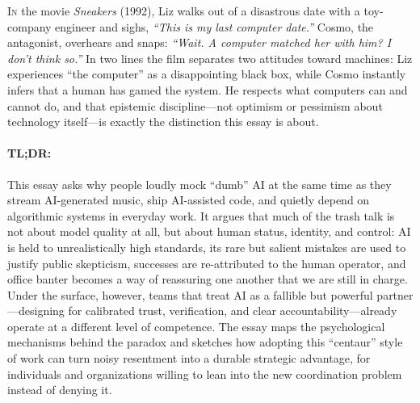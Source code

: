 \documentclass[11pt, a4paper, twocolumn]{article} %
\begin{document}
\color{white}


\vspace*{\fill}

\noindent
\makeatletter
\@date\par
\makeatother

\vspace*{0.2cm}

\lettrine[lines=3,lhang=0.1,findent=1pt]{I}n the movie \emph{Sneakers} (1992), Liz walks out of a disastrous date with a toy-company engineer and sighs, \textit{``This is my last computer date.''} Cosmo, the antagonist, overhears and snaps: \textit{``Wait. A computer matched her with him? I don't think so.''} In two lines the film separates two attitudes toward machines: Liz experiences ``the computer'' as a disappointing black box, while Cosmo instantly infers that a human has gamed the system. He respects what computers can and cannot do, and that epistemic discipline---not optimism or pessimism about technology itself---is exactly the distinction this essay is about.

\newpage
\vspace*{\fill}

\paragraph{TL;DR:} This essay asks why people loudly mock ``dumb'' AI at the same time as they stream AI-generated music, ship AI-assisted code, and quietly depend on algorithmic systems in everyday work. It argues that much of the trash talk is not about model quality at all, but about human status, identity, and control: AI is held to unrealistically high standards, its rare but salient mistakes are used to justify public skepticism, successes are re-attributed to the human operator, and office banter becomes a way of reassuring one another that we are still in charge. Under the surface, however, teams that treat AI as a fallible but powerful partner---designing for calibrated trust, verification, and clear accountability---already operate at a different level of competence. The essay maps the psychological mechanisms behind the paradox and sketches how adopting this ``centaur'' style of work can turn noisy resentment into a durable strategic advantage, for individuals and organizations willing to lean into the new coordination problem instead of denying it.
\end{document}
